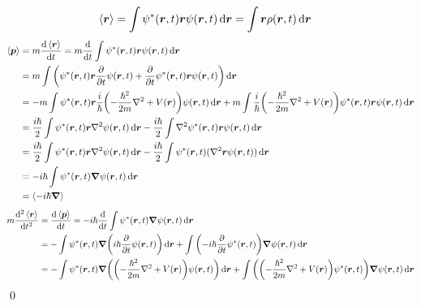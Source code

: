 \documentclass[uplatex,dvipdfmx,a4paper,11pt]{jlreq}
\makeatletter
\newcommand{\rr}{\bm{r}}
\newcommand{\pp}{\bm{p}}
\numberwithin{equation}{section}
\theoremstyle{definition}
\renewenvironment{proof}[1][\proofname]{\par
  \normalfont
  \topsep6\p@\@plus6\p@ \trivlist
  \item[\hskip\labelsep{\bfseries #1}\@addpunct{\bfseries}]\ignorespaces\quad\par
}{%
  \qed\endtrivlist\@endpefalse
}
\renewcommand\proofname{証明}
\makeatother
\begin{document}
\begin{proof}
  \begin{align}
    \ev{\rr} & = \int\psi^*(\rr, t)\rr\psi(\rr, t)\dd{\rr} = \int\rr\rho(\rr, t)\dd{\rr}
  \end{align}
  \begin{align}
    \ev{\pp} & = m\dv{\ev{\rr}}{t} = m\dv{t}\int\psi^*(\rr, t)\rr\psi(\rr, t)\dd{\rr}                                                                                                                                       \\
             & = m\int\qty(\psi^*(\rr, t)\rr\pdv{t}\psi(\rr, t) + \pdv{t}\psi^*(\rr, t)\rr\psi(\rr, t))\dd{\rr}                                                                                                             \\
             & = -m\int\psi^*(\rr, t)\rr\frac{i}{\hbar}\qty(-\frac{\hbar^2}{2m}\nabla^2 + V(\rr))\psi(\rr, t)\dd{\rr} + m\int\frac{i}{\hbar}\qty(-\frac{\hbar^2}{2m}\nabla^2 + V(\rr))\psi^*(\rr, t)\rr\psi(\rr, t)\dd{\rr} \\
             & = \frac{i\hbar}{2}\int\psi^*(\rr, t)\rr\nabla^2\psi(\rr, t)\dd{\rr} - \frac{i\hbar}{2}\int\nabla^2\psi^*(\rr, t)\rr\psi(\rr, t)\dd{\rr}                                                                      \\
             & = \frac{i\hbar}{2}\int\psi^*(\rr, t)\rr\nabla^2\psi(\rr, t)\dd{\rr} - \frac{i\hbar}{2}\int\psi^*(\rr, t)(\nabla^2\rr\psi(\rr, t))\dd{\rr}                                                                    \\
             & = -i\hbar\int\psi^*(\rr, t)\vnabla\psi(\rr, t)\dd{\rr}                                                                                                                                                       \\
             & = \ev{-i\hbar\vnabla}
  \end{align}
  \begin{align}
    m\dv[2]{\ev{\rr}}{t} & = \dv{\ev{\pp}}{t} = -i\hbar\dv{t}\int\psi^*(\rr, t)\vnabla\psi(\rr, t)\dd{\rr}                                                                                                                  \\
                         & = -\int\psi^*(\rr, t)\vnabla\qty(i\hbar\pdv{t}\psi(\rr, t))\dd{\rr} + \int\qty(-i\hbar\pdv{t}\psi^*(\rr, t))\vnabla\psi(\rr, t)\dd{\rr}                                                          \\
                         & = -\int\psi^*(\rr, t)\vnabla\qty(\qty(-\frac{\hbar^2}{2m}\nabla^2 + V(\rr))\psi(\rr, t))\dd{\rr} + \int\qty(\qty(-\frac{\hbar^2}{2m}\nabla^2 + V(\rr))\psi^*(\rr, t))\vnabla\psi(\rr, t)\dd{\rr} \\

\end{align}
\end{proof}
\end{document}
